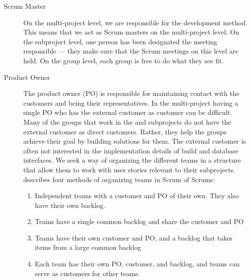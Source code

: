 \begin{description}
  \item[Scrum Master] On the multi-project level, we are responsible for the development method. This means that we act as Scrum masters on the multi-project level. On the subproject level, one person has been designated the meeting responsible --- they make sure that the Scrum meetings on this level are held. On the group level, each group is free to do what they see fit.
  \item[Product Owner] The product owner (PO) is responsible for maintaining contact with the customers and being their representatives. In the multi-project having a single PO who has the external customer as customer can be difficult. Many of the groups that work in the \bd and \db subprojects do not have the external customer as direct customers. Rather, they help the \gui groups achieve their goal by building solutions for them. The external customer is often not interested in the implementation details of build and database interfaces. We seek a way of organizing the different teams in a structure that allow them to work with user stories relevant to their subprojects.  \textcite{bird_davies_2007} describes four methods of organizing teams in Scrum of Scrums:
  \begin{enumerate}
    \item Independent teams with a customer and PO of their own. They also have their own backlog.
    \item Teams have a single common backlog and share the customer and PO
    \item Teams have their own customer and PO, and a backlog that takes items from a large common backlog
    \item Each team has their own PO, customer, and backlog, and teams can serve as customers for other teams.
  \end{enumerate}

\end{description}
